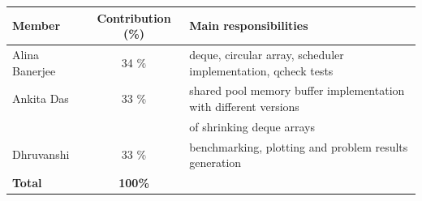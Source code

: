 \documentclass[11pt,a4paper]{article}
\begin{document}

\begin{center}
\begin{tabular}{@{}lcl@{}}
\toprule
\textbf{Member} & \textbf{Contribution (\%)} & \textbf{Main responsibilities} \\
\midrule
Alina Banerjee  & 34 \% & deque, circular array, scheduler implementation,
                          qcheck tests\\
Ankita Das      & 33 \% & shared pool memory buffer implementation with
different versions \\ & & of shrinking deque arrays \\
Dhruvanshi      & 33 \% & benchmarking, plotting and problem results generation\\
\midrule
\textbf{Total} & \textbf{100\%} & \\
\bottomrule
\end{tabular}
\end{center}



\end{document}
